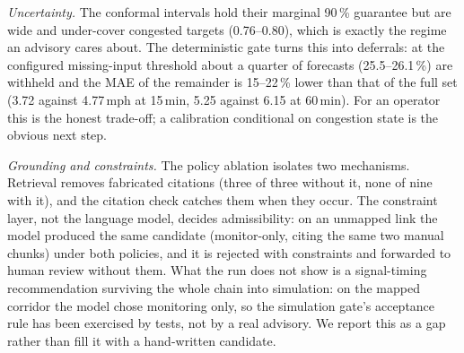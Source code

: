 \textit{Uncertainty.} The conformal intervals hold their marginal 90\,\% guarantee but are wide and under-cover
congested targets (0.76--0.80), which is exactly the regime an advisory cares about. The deterministic gate turns
this into deferrals: at the configured missing-input threshold about a quarter of forecasts (25.5--26.1\,\%) are
withheld and the MAE of the remainder is 15--22\,\% lower than that of the full set (3.72 against 4.77\,mph at
15\,min, 5.25 against 6.15 at 60\,min). For an
operator this is the honest trade-off; a calibration conditional on congestion state is the obvious next step.

\textit{Grounding and constraints.} The policy ablation isolates two mechanisms. Retrieval removes fabricated
citations (three of three without it, none of nine with it), and the citation check catches them when they occur.
The constraint layer, not the language model, decides admissibility: on an unmapped link the model produced the same
candidate (monitor-only, citing the same two manual chunks) under both policies, and it is rejected with
constraints and forwarded to human review without them. What the run does not show is a signal-timing
recommendation surviving the whole chain into simulation: on the mapped corridor the model chose monitoring only,
so the simulation gate's acceptance rule has been exercised by tests, not by a real advisory. We report this as a
gap rather than fill it with a hand-written candidate.

